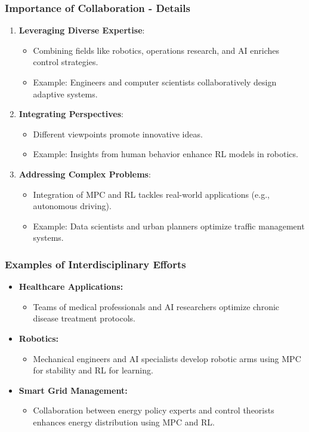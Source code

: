 \documentclass[aspectratio=169]{beamer}
\begin{document}
\begin{frame}[fragile]
    \frametitle{Importance of Collaboration - Details}
    \begin{enumerate}
        \item \textbf{Leveraging Diverse Expertise}:
            \begin{itemize}
                \item Combining fields like robotics, operations research, and AI enriches control strategies.
                \item Example: Engineers and computer scientists collaboratively design adaptive systems.
            \end{itemize}
        \item \textbf{Integrating Perspectives}:
            \begin{itemize}
                \item Different viewpoints promote innovative ideas.
                \item Example: Insights from human behavior enhance RL models in robotics.
            \end{itemize}
        \item \textbf{Addressing Complex Problems}:
            \begin{itemize}
                \item Integration of MPC and RL tackles real-world applications (e.g., autonomous driving).
                \item Example: Data scientists and urban planners optimize traffic management systems.
            \end{itemize}
    \end{enumerate}
\end{frame}

\begin{frame}[fragile]
    \frametitle{Examples of Interdisciplinary Efforts}
    \begin{itemize}
        \item \textbf{Healthcare Applications:}
            \begin{itemize}
                \item Teams of medical professionals and AI researchers optimize chronic disease treatment protocols.
            \end{itemize}
        \item \textbf{Robotics:}
            \begin{itemize}
                \item Mechanical engineers and AI specialists develop robotic arms using MPC for stability and RL for learning.
            \end{itemize}
        \item \textbf{Smart Grid Management:}
            \begin{itemize}
                \item Collaboration between energy policy experts and control theorists enhances energy distribution using MPC and RL.
            \end{itemize}
    \end{itemize}
\end{frame}
\end{document}
